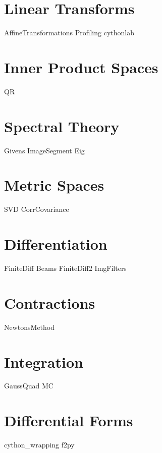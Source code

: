 \documentclass[nociteref]{SIAM-GH-book}
\begin{document}
\part{Linear Transforms}
{AffineTransformations}
{Profiling}
{cythonlab}

\part{Inner Product Spaces}
{QR}


\part{Spectral Theory}
{Givens}
{ImageSegment}
{Eig}


\part{Metric Spaces}
{SVD}
{CorrCovariance}

\part{Differentiation}
{FiniteDiff}
{Beams}
{FiniteDiff2}
{ImgFilters}

\part{Contractions}
{NewtonsMethod}


\part{Integration}
{GaussQuad}
{MC}

\part{Differential Forms}
{cython_wrapping}
{f2py}
\end{document}
